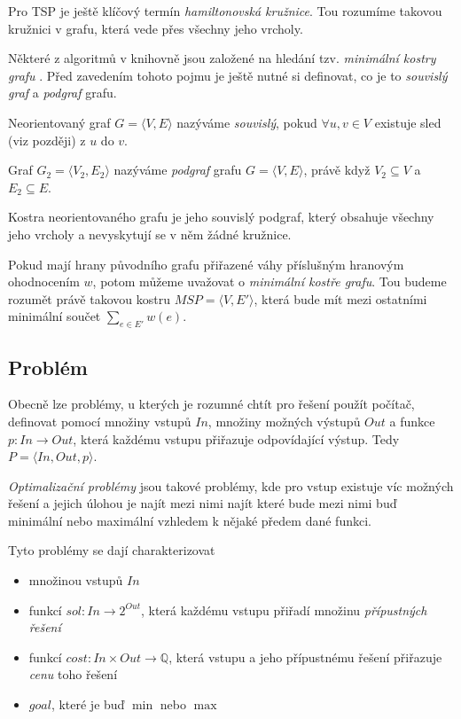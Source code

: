 \documentclass[
  biblatex,
  figures=false,
  glossaries,
  index
]{kidiplom}
\begin{document}
Pro TSP je ještě klíčový termín \textit{hamiltonovská kružnice}. Tou rozumíme takovou kružnici v grafu, která vede přes všechny jeho vrcholy.
\newline

Některé z algoritmů v knihovně jsou založené na hledání tzv. \textit{minimální kostry grafu} . Před zavedením tohoto pojmu je ještě nutné si definovat, co je to \textit{souvislý graf} a \textit{podgraf} grafu.

\begin{definition}
Neorientovaný graf $G=\langle V, E \rangle$ nazýváme \textit{souvislý}, pokud $\forall u,v \in V$ existuje sled (viz později) z $u$ do $v$.
\end{definition}

\begin{definition}[Podgraf]
Graf $G_2=\langle V_2, E_2 \rangle$ nazýváme \textit{podgraf} grafu $G=\langle V, E \rangle$, právě když $V_2 \subseteq V$ a $E_2 \subseteq  E$.
\end{definition}

\begin{definition}
Kostra neorientovaného grafu je jeho souvislý podgraf, který obsahuje všechny jeho vrcholy a nevyskytují se v něm žádné kružnice.
\end{definition}

Pokud mají hrany původního grafu přiřazené váhy příslušným hranovým ohodnocením $w$, potom můžeme uvažovat o \textit{minimální kostře grafu}. Tou budeme rozumět právě takovou kostru $MSP = \langle V, E' \rangle$, která bude mít mezi ostatními minimální součet  $\sum_{e \in E'} w(e)$.

\subsection{Problém}
Obecně lze problémy, u kterých je rozumné chtít pro řešení použít počítač, definovat pomocí množiny vstupů $In$, množiny možných výstupů $Out$ a funkce $p : In \rightarrow Out$, která každému vstupu přiřazuje odpovídající výstup. Tedy $P = \langle In, Out, p \rangle$.

\textit{Optimalizační problémy} jsou takové problémy, kde pro vstup existuje víc možných řešení a jejich úlohou je najít mezi nimi najít které bude mezi nimi buď minimální nebo maximální vzhledem k nějaké předem dané funkci.

Tyto problémy se dají charakterizovat 
\begin{itemize}
\item množinou vstupů $In$
\item funkcí $sol : In \rightarrow 2^{Out}$, která každému vstupu přiřadí množinu \textit{přípustných řešení}
\item funkcí $cost : In \times Out \rightarrow \mathbb{Q}$, která vstupu a jeho přípustnému řešení přiřazuje \textit{cenu} toho řešení
\item $goal$, které je buď $\min$ nebo $\max$
\end{itemize}
\end{document}
